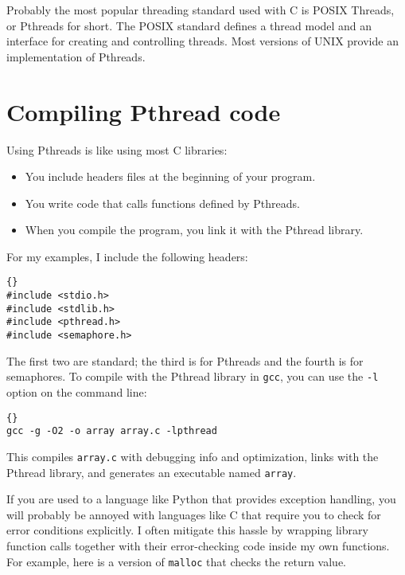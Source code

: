 Probably the most popular threading standard used with C is
POSIX Threads, or Pthreads for short.  The POSIX standard defines
a thread model and an interface for creating and controlling
threads.  Most versions of UNIX provide an implementation of
Pthreads.

\section{Compiling Pthread code}

Using Pthreads is like using most C libraries:

\begin{itemize}

\item You include headers files at the beginning of your
program.

\item You write code that calls functions defined by Pthreads.

\item When you compile the program, you link it with the
Pthread library.

\end{itemize}

For my examples, I include the following headers:

\begin{lstlisting}[title={Headers}]{}
#include <stdio.h>
#include <stdlib.h>
#include <pthread.h>
#include <semaphore.h>
\end{lstlisting}

The first two are standard; the third is for Pthreads and
the fourth is for semaphores.
To compile with the Pthread library in {\tt gcc}, you
can use the {\tt -l}
option on the command line:

\begin{lstlisting}[title={}]{}
gcc -g -O2 -o array array.c -lpthread
\end{lstlisting}

This compiles {\tt array.c} with debugging info and optimization,
links with the Pthread library, and generates an executable
named {\tt array}.

If you are used to a language like Python that provides exception
handling, you will probably be annoyed with languages like C that
require you to check for error conditions explicitly.  I often
mitigate this hassle by wrapping library function calls
together with their error-checking code inside my own functions.
For example, here is a version of {\tt malloc}
that checks the return value.

